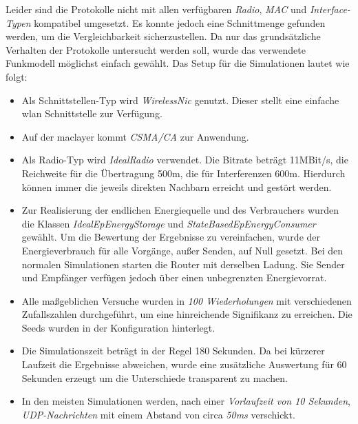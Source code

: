 Leider sind die Protokolle nicht mit allen verfügbaren \textit{Radio}, \textit{MAC} und \textit{Interface-Typen} kompatibel umgesetzt. Es konnte jedoch eine Schnittmenge gefunden werden, um die Vergleichbarkeit sicherzustellen. Da nur das grundsätzliche Verhalten der Protokolle untersucht werden soll, wurde das verwendete Funkmodell möglichst einfach gewählt. Das Setup für die Simulationen lautet wie folgt:

\begin{itemize}
\item Als Schnittstellen-Typ wird \textit{WirelessNic} genutzt. Dieser stellt eine einfache \gls{wlan} Schnittstelle zur Verfügung.
\item Auf der \gls{maclayer} kommt \textit{CSMA/CA} zur Anwendung.
\item Als Radio-Typ wird \textit{IdealRadio} verwendet. Die Bitrate beträgt 11MBit/s, die Reichweite für die Übertragung 500m, die für Interferenzen 600m. Hierdurch können immer die jeweils direkten Nachbarn erreicht und gestört werden.
\item Zur Realisierung der endlichen Energiequelle und des Verbrauchers wurden die Klassen \textit{IdealEpEnergyStorage} und \textit{StateBasedEpEnergyConsumer} gewählt. Um die Bewertung der Ergebnisse zu vereinfachen, wurde der Energieverbrauch für alle Vorgänge, außer Senden, auf Null gesetzt. Bei den normalen Simulationen starten die Router mit derselben Ladung. Sie Sender und Empfänger verfügen jedoch über einen unbegrenzten Energievorrat.
\item Alle maßgeblichen Versuche wurden in \textit{100 Wiederholungen} mit verschiedenen Zufallszahlen durchgeführt, um eine hinreichende Signifikanz zu erreichen. Die Seeds wurden in der Konfiguration hinterlegt.
\item Die Simulationszeit beträgt in der Regel 180 Sekunden. Da bei kürzerer Laufzeit die Ergebnisse abweichen, wurde eine zusätzliche Auswertung für 60 Sekunden erzeugt um die Unterschiede transparent zu machen.
\item In den meisten Simulationen werden, nach einer \textit{Vorlaufzeit von 10 Sekunden}, \textit{UDP-Nachrichten} mit einem Abstand von circa \textit{50ms} verschickt.
\end{itemize}

